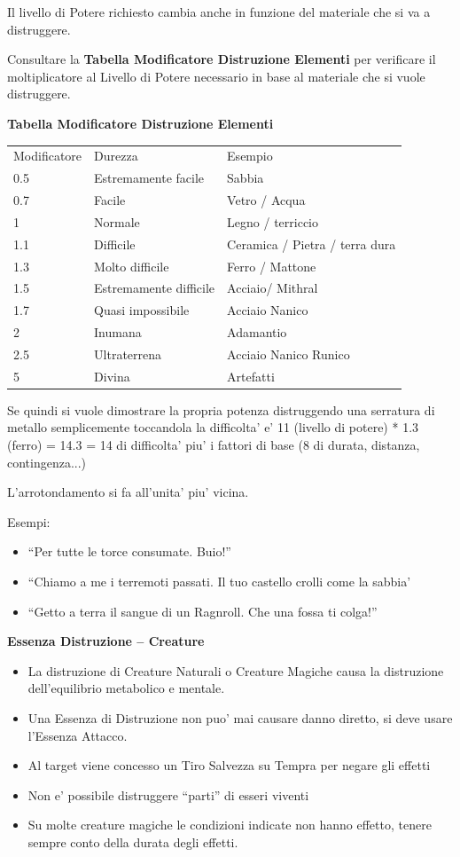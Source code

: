\documentclass[a4paper,11pt,twoside,openany]{dndbook}
\begin{document}
\bigskip

Il livello di Potere richiesto cambia anche in funzione del materiale che si va a distruggere.

\bigskip

Consultare la \textbf{Tabella Modificatore Distruzione Elementi} per verificare il moltiplicatore al Livello di Potere necessario in base al materiale che si vuole distruggere.

\bigskip

\textbf{Tabella Modificatore Distruzione Elementi}

\begin{tabular}[c]{@{}lll@{}}
\toprule 
Modificatore & Durezza & Esempio\tabularnewline
0.5 & Estremamente facile & Sabbia\tabularnewline
0.7 & Facile & Vetro / Acqua\tabularnewline
1 & Normale & Legno / terriccio\tabularnewline
1.1 & Difficile & Ceramica / Pietra / terra dura\tabularnewline
1.3 & Molto difficile & Ferro / Mattone\tabularnewline
1.5 & Estremamente difficile & Acciaio/ Mithral\tabularnewline
1.7 & Quasi impossibile & Acciaio Nanico\tabularnewline
2 & Inumana & Adamantio\tabularnewline
2.5 & Ultraterrena & Acciaio Nanico Runico\tabularnewline
5 & Divina & Artefatti\tabularnewline
\bottomrule
\end{tabular}

\bigskip

Se quindi si vuole dimostrare la propria potenza distruggendo una serratura di metallo semplicemente toccandola la difficolta' e' 11 (livello di potere) {*} 1.3 (ferro) = 14.3 = 14 di difficolta' piu' i fattori di base (8 di durata, distanza, contingenza...)

L'arrotondamento si fa all'unita' piu' vicina.

Esempi:
\begin{itemize}
\item 
``Per tutte le torce consumate. Buio!'' 
\item 
``Chiamo a me i terremoti passati. Il tuo castello crolli come la sabbia' 
\item 
``Getto a terra il sangue di un Ragnroll. Che una fossa ti colga!'' 
\end{itemize}


\textbf{Essenza Distruzione -- Creature}
\begin{itemize}
\item 
La distruzione di Creature Naturali o Creature Magiche causa la distruzione dell'equilibrio metabolico e mentale. 
\item 
Una Essenza di Distruzione non puo' mai causare danno diretto, si deve usare l'Essenza Attacco. 
\item 
Al target viene concesso un Tiro Salvezza su Tempra per negare gli effetti 
\item 
Non e' possibile distruggere ``parti'' di esseri viventi 
\item 
Su molte creature magiche le condizioni indicate non hanno effetto, tenere sempre conto della durata degli effetti. 
\end{itemize}
\end{document}
